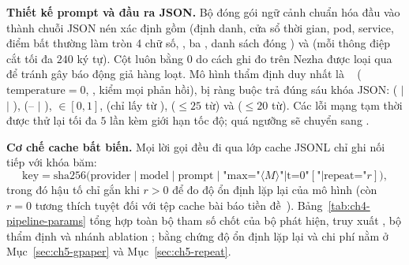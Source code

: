 \textbf{Thiết kế prompt và đầu ra JSON.} Bộ đóng gói ngữ cảnh chuẩn hóa đầu vào thành chuỗi JSON nén xác định gồm  (định danh, cửa sổ thời gian, pod, service, điểm bất thường làm tròn 4 chữ số, , ba , danh sách đóng ) và  (mỗi thông điệp cắt tối đa $240$ ký tự). Cột  luôn bằng $0$ do cách ghi đo trên Nezha được loại qua  để tránh gây báo động giả hàng loạt. Mô hình thẩm định duy nhất là ~\cite{google2026gemini} ($\text{temperature} = 0$, , kiểm  mọi phản hồi), bị ràng buộc trả đúng sáu khóa JSON:  ( $\mid$  $\mid$ ),  (-- $\mid$ ),  $\in [0, 1]$,  (chỉ lấy từ ),  ($\le 25$ từ) và  ($\le 20$ từ). Các lỗi mạng tạm thời được thử lại tối đa $5$ lần kèm giới hạn tốc độ; quá ngưỡng sẽ chuyển sang .

\textbf{Cơ chế cache bất biến.} Mọi lời gọi đều đi qua lớp cache JSONL chỉ ghi nối tiếp với khóa băm:
\begin{equation}
  \text{key} = \text{sha256}\big(\text{provider} \mid \text{model} \mid \text{prompt} \mid \text{"max="}\langle M \rangle\text{"|t=0"}[\text{"|repeat="}r]\big),
  \label{eq:ch4-cache-key}
\end{equation}
trong đó hậu tố  chỉ gắn khi $r > 0$ để đo độ ổn định lặp lại của mô hình (còn $r = 0$ tương thích tuyệt đối với tệp cache bài báo tiền đề~\cite{icaetm2026}). Bảng~\ref{tab:ch4-pipeline-params} tổng hợp toàn bộ tham số chốt của bộ phát hiện, truy xuất , bộ thẩm định và nhánh ablation ; bằng chứng độ ổn định lặp lại và chi phí nằm ở Mục~\ref{sec:ch5-gpaper} và Mục~\ref{sec:ch5-repeat}.

